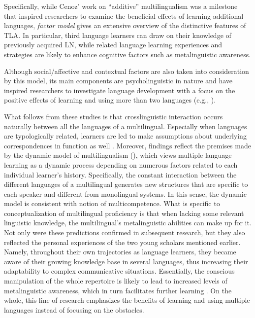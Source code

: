 \documentclass[output=paper]{../langscibook}
\begin{document}
Specifically, while Cenoz’ work on “additive” multilingualism \citep{Cenoz2003} was a milestone that inspired researchers to examine the beneficial effects of learning additional languages,  \emph{factor model} gives an extensive overview of the distinctive features of TLA. In particular, third language learners can draw on their knowledge of previously acquired LN, while related language learning experiences and strategies are likely to enhance cognitive factors such as metalinguistic awareness. 

Although social/affective and contextual factors are also taken into consideration by this model, its main components are psycholinguistic in nature and have inspired researchers to investigate language development with a focus on the positive effects of learning and using more than two languages (e.g., \citealt{PeyerEtAl2010}).

What follows from these studies is that crosslinguistic interaction occurs naturally between all the languages of a multilingual. Especially when languages are typologically related, learners are led to make assumptions about underlying correspondences in function as well \citep{Ringbom2007}. Moreover, findings reflect the premises made by the dynamic model of multilingualism (\citealt{HerdinaJessner2002}), which views multiple language learning as a dynamic process depending on numerous factors related to each individual learner’s history. Specifically, the constant interaction between the different languages of a multilingual generates new structures that are specific to each speaker and different from monolingual systems. In this sense, the dynamic model is consistent with  notion of multicompetence. What is specific to   conceptualization of multilingual proficiency is that when lacking some relevant linguistic knowledge, the multilingual’s metalinguistic abilities can make up for it. Not only were these predictions confirmed in subsequent research, but they also reflected the personal experiences of the two young scholars mentioned earlier. Namely, throughout their own trajectories as language learners, they became aware of their growing knowledge base in several languages, thus increasing their adaptability to complex communicative situations. Essentially, the conscious manipulation of the whole repertoire is likely to lead to increased levels of metalinguistic awareness, which in turn facilitates further learning \citep{Jessner2017}. On the whole, this line of research emphasizes the benefits of learning and using multiple languages instead of focusing on the obstacles.
\end{document}
